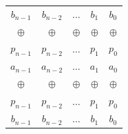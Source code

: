 \begin{tabular}{ccccc}\toprule
\textcolor{DEtekst}{$b_{n-1}$} & \textcolor{DEtekst}{$b_{n-2}$} & \textcolor{DEtekst}{$\ldots$} & \textcolor{DEtekst}{$b_{1}$} & \textcolor{DEtekst}{$b_{0}$}\\
\textcolor{DEtekst}{$\oplus$} & \textcolor{DEtekst}{$\oplus$} & \textcolor{DEtekst}{$\oplus$} & \textcolor{DEtekst}{$\oplus$} & \textcolor{DEtekst}{$\oplus$}\\
\textcolor{DEcrvena}{$p_{n-1}$} & \textcolor{DEcrvena}{$p_{n-2}$} & \textcolor{DEcrvena}{$\ldots$} & \textcolor{DEcrvena}{$p_{1}$} & \textcolor{DEcrvena}{$p_{0}$}\\
\midrule
\textcolor{DEcrvena}{$a_{n-1}$} & \textcolor{DEcrvena}{$a_{n-2}$} & \textcolor{DEcrvena}{$\ldots$} & \textcolor{DEcrvena}{$a_{1}$} & \textcolor{DEcrvena}{$a_{0}$}\\
\textcolor{DEtekst}{$\oplus$} & \textcolor{DEtekst}{$\oplus$} & \textcolor{DEtekst}{$\oplus$} & \textcolor{DEtekst}{$\oplus$} & \textcolor{DEtekst}{$\oplus$}\\
\textcolor{DEcrvena}{$p_{n-1}$} & \textcolor{DEcrvena}{$p_{n-2}$} & \textcolor{DEcrvena}{$\ldots$} & \textcolor{DEcrvena}{$p_{1}$} & \textcolor{DEcrvena}{$p_{0}$}\\
\midrule
\textcolor{DEtekst}{$b_{n-1}$} & \textcolor{DEtekst}{$b_{n-2}$} & \textcolor{DEtekst}{$\ldots$} & \textcolor{DEtekst}{$b_{1}$} & \textcolor{DEtekst}{$b_{0}$}\\
\bottomrule\end{tabular}
